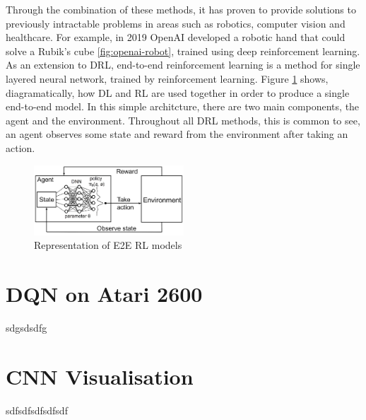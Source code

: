 Through the combination of these methods, it has proven to provide solutions to previously intractable problems \cite{rl-survey} in areas such as robotics, computer vision and healthcare. For example, in 2019 OpenAI developed a robotic hand that could solve a Rubik's cube \ref{fig:openai-robot}, trained using deep reinforcement learning. As an extension to DRL, end-to-end reinforcement learning is a method for single layered neural network, trained by reinforcement learning. Figure \ref{fig:e2e-rl} shows, diagramatically, how DL and RL are used together in order to produce a single end-to-end model. In this simple architcture, there are two main components, the agent and the environment. Throughout all DRL methods, this is common to see, an agent observes some state and reward from the environment after taking an action.

\begin{figure}[htbp]
	\centering
	\includegraphics[width=0.5\textwidth]{chapters/chapter2/images/e2e-rl.jpg}
	\caption{Representation of E2E RL models
		\label{fig:e2e-rl}
	}
\end{figure}

\section{DQN on Atari 2600}
\label{bg:sec:dqn}
sdgsdsdfg

\section{CNN Visualisation}
\label{bg:sec:cnn-vis}
sdfsdfsdfsdfsdf